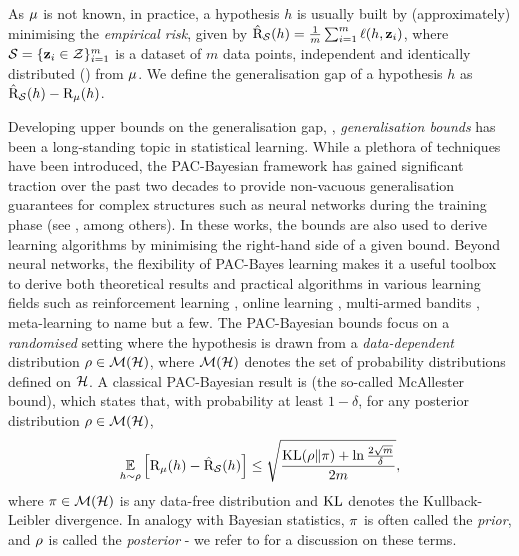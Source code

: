 \documentclass{article}
\begin{document}
As $\D$ is not known, in practice, a hypothesis $h$ is usually built by (approximately) minimising the \emph{empirical risk}, given by $\Riskhat_{\S}(h) = \frac{1}{m}\sum_{i=1}^{m}\loss(h , \z_i)$, where $\S = \{ \z_i \in \Z \}_{i=1}^{m}$ is a dataset of $m$ data points, independent and identically distributed (\iid) from $\D$. 
We define the generalisation gap of a hypothesis $h$ as $\Riskhat_{\S}(h) - \Risk_{\D}(h)$.

Developing upper bounds on the generalisation gap, \ie, \emph{generalisation bounds} has been a long-standing topic in statistical learning.
While a plethora of techniques have been introduced, the PAC-Bayesian framework has gained significant traction over the past two decades to provide non-vacuous generalisation guarantees for complex structures such as neural networks during the training phase (see \citealp{dziugaite2017computing,perez2021progress,perez2021tighter}, among others).
In these works, the bounds are also used to derive learning algorithms by minimising the right-hand side of a given bound.
Beyond neural networks, the flexibility of PAC-Bayes learning makes it a useful toolbox to derive both theoretical results and practical algorithms in various learning fields such as reinforcement learning \citep{fard2010pac}, online learning \citep{haddouche2022online}, multi-armed bandits \citep{seldin2011pac,seldin2012pac,sakhi2022pac}, meta-learning \citep{amit2018meta,farid2021generalization,rothfuss2021pacoh,rothfuss2022pac,ding2021bridging} to name but a few. 
The PAC-Bayesian bounds focus on a \emph{randomised} setting where the hypothesis is drawn from a \emph{data-dependent} distribution $\Q \in\Mcal(\H)$, where $\Mcal(\H)$ denotes the set of probability distributions defined on $\H$.
A classical PAC-Bayesian result is \cite[Theorem 5]{maurer2004note} (the so-called McAllester bound), which states that, with probability at least $1-\delta$, for any posterior distribution $\Q\in\Mcal(\H)$,
\begin{align*}
 \EE_{h\sim\Q}\Big[ \Risk_{\D}(h) - \Riskhat_{\S}(h) \Big] \le \sqrt{\frac{\KL(\Q\|\P) + \ln{\frac{2\sqrt{m}}{\delta}}}{2m}},
\end{align*}
where $\P \in \Mcal(\H)$ is any data-free distribution and $\KL$ denotes the Kullback-Leibler divergence. 
In analogy with Bayesian statistics, $\P$ is often called the \emph{prior}, and $\Q$ is called the \emph{posterior} - we refer to \cite{guedj2019primer} for a discussion on these terms.
\end{document}
